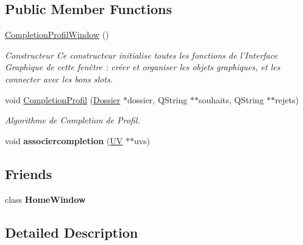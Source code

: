 \subsection*{Public Member Functions}
\begin{DoxyCompactItemize}
\item 
\hypertarget{class_completion_profil_window_a41997a68d2025526bb8b7e44a2d0fd95}{\hyperlink{class_completion_profil_window_a41997a68d2025526bb8b7e44a2d0fd95}{Completion\-Profil\-Window} ()}\label{class_completion_profil_window_a41997a68d2025526bb8b7e44a2d0fd95}

\begin{DoxyCompactList}\small\item\em Constructeur Ce constructeur initialise toutes les fonctions de l'Interface Graphique de cette fenêtre \-: créer et organiser les objets graphiques, et les connecter avec les bons slots. \end{DoxyCompactList}\item 
void \hyperlink{class_completion_profil_window_a217a870ed07c3b7157422195e21e1422}{Completion\-Profil} (\hyperlink{class_dossier}{Dossier} $\ast$dossier, Q\-String $\ast$$\ast$souhaits, Q\-String $\ast$$\ast$rejets)
\begin{DoxyCompactList}\small\item\em Algorithme de Completion de Profil. \end{DoxyCompactList}\item 
\hypertarget{class_completion_profil_window_a895aed548c69ea5c5953165ef4b11c3b}{void {\bfseries associercompletion} (\hyperlink{class_u_v}{U\-V} $\ast$$\ast$uvs)}\label{class_completion_profil_window_a895aed548c69ea5c5953165ef4b11c3b}

\end{DoxyCompactItemize}
\subsection*{Friends}
\begin{DoxyCompactItemize}
\item 
\hypertarget{class_completion_profil_window_a89f0e38a39f054c26a0ab852f8a79b18}{class {\bfseries Home\-Window}}\label{class_completion_profil_window_a89f0e38a39f054c26a0ab852f8a79b18}

\end{DoxyCompactItemize}


\subsection{Detailed Description}


